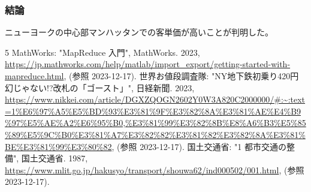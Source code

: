 \documentclass[10pt]{jarticle}
\begin{document}
\subsubsection{結論}
%
ニューヨークの中心部マンハッタンでの客単価が高いことが判明した。
%

\begin{thebibliography}{5}
    MathWorks: "MapReduce 入門", MathWorks. 2023, \\
    \url{https://jp.mathworks.com/help/matlab/import_export/getting-started-with-mapreduce.html}, (参照 2023-12-17).
		世界お値段調査隊: "NY地下鉄初乗り420円 幻じゃない!?改札の「ゴースト」", 日経新聞. 2023, \\
		\url{https://www.nikkei.com/article/DGXZQOGN2602Y0W3A820C2000000/#:~:text=1%E6%97%A5%E5%BD%93%E3%81%9F%E3%82%8A%E3%81%AE%E4%B9%97%E5%AE%A2%E6%95%B0,%E3%81%99%E3%82%8B%E8%A6%B3%E5%85%89%E5%9C%B0%E3%81%A7%E3%82%82%E3%81%82%E3%82%8A%E3%81%BE%E3%81%99%E3%80%82}, (参照 2023-12-17).
    国土交通省: "1 都市交通の整備", 国土交通省. 1987, \\
    \url{https://www.mlit.go.jp/hakusyo/transport/shouwa62/ind000502/001.html}, (参照 2023-12-17).
\end{thebibliography}
\end{document}
